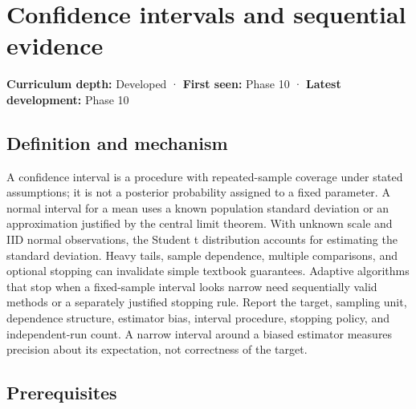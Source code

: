 \hypertarget{appendix-c83016554b1e}{}\label{referencestart:appendix-c83016554b1e}
\section{Confidence intervals and sequential evidence}\label{appendix-c83016554b1e-confidence-intervals-and-sequential-evidence}

\hypertarget{appendix-c83016554b1e-confidence-intervals-and-sequential-evidence}{}

\textbf{Curriculum depth:} Developed · \textbf{First seen:} Phase 10 · \textbf{Latest development:} Phase 10

\begin{allmightroledefinition}

\subsection{Definition and mechanism}\label{appendix-c83016554b1e-definition-and-mechanism}

\hypertarget{appendix-c83016554b1e-definition-and-mechanism}{}

A confidence interval is a procedure with repeated-sample coverage under stated assumptions; it is not a posterior probability assigned to a fixed parameter. A normal interval for a mean uses a known population standard deviation or an approximation justified by the central limit theorem. With unknown scale and IID normal observations, the Student t distribution accounts for estimating the standard deviation. Heavy tails, sample dependence, multiple comparisons, and optional stopping can invalidate simple textbook guarantees. Adaptive algorithms that stop when a fixed-sample interval looks narrow need sequentially valid methods or a separately justified stopping rule. Report the target, sampling unit, dependence structure, estimator bias, interval procedure, stopping policy, and independent-run count. A narrow interval around a biased estimator measures precision about its expectation, not correctness of the target.

\end{allmightroledefinition}

\subsection{Prerequisites}\label{appendix-c83016554b1e-prerequisites}

\hypertarget{appendix-c83016554b1e-prerequisites}{}


